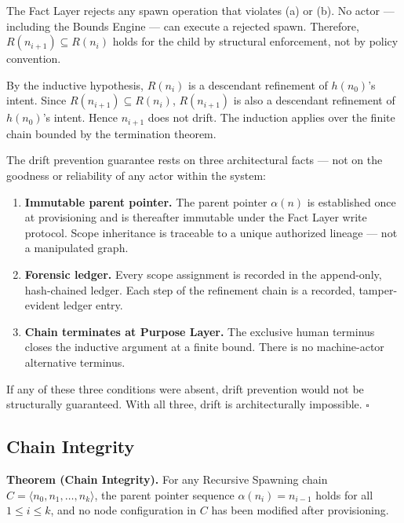 The Fact Layer rejects any spawn operation that violates (a) or (b). No actor — including the Bounds Engine — can execute a rejected spawn. Therefore, $R(n_{i+1}) \subseteq R(n_i)$ holds for the child by structural enforcement, not by policy convention.

By the inductive hypothesis, $R(n_i)$ is a descendant refinement of $h(n_0)$'s intent. Since $R(n_{i+1}) \subseteq R(n_i)$, $R(n_{i+1})$ is also a descendant refinement of $h(n_0)$'s intent. Hence $n_{i+1}$ does not drift. The induction applies over the finite chain bounded by the termination theorem.

\medskip
The drift prevention guarantee rests on three architectural facts — not on the goodness or reliability of any actor within the system:

\begin{enumerate}
    \item[(1)] \textbf{Immutable parent pointer.} The parent pointer $\alpha(n)$ is established once at provisioning and is thereafter immutable under the Fact Layer write protocol. Scope inheritance is traceable to a unique authorized lineage — not a manipulated graph.
    \item[(2)] \textbf{Forensic ledger.} Every scope assignment is recorded in the append-only, hash-chained ledger. Each step of the refinement chain is a recorded, tamper-evident ledger entry.
    \item[(3)] \textbf{Chain terminates at Purpose Layer.} The exclusive human terminus closes the inductive argument at a finite bound. There is no machine-actor alternative terminus.
\end{enumerate}

If any of these three conditions were absent, drift prevention would not be structurally guaranteed. With all three, drift is architecturally impossible. $\square$

\subsection{Chain Integrity}
\label{sec:rs-chain-integrity-proof}

\medskip
\noindent\textbf{Theorem (Chain Integrity).} For any Recursive Spawning chain $C = \langle n_0, n_1, \ldots, n_k \rangle$, the parent pointer sequence $\alpha(n_i) = n_{i-1}$ holds for all $1 \leq i \leq k$, and no node configuration in $C$ has been modified after provisioning.

